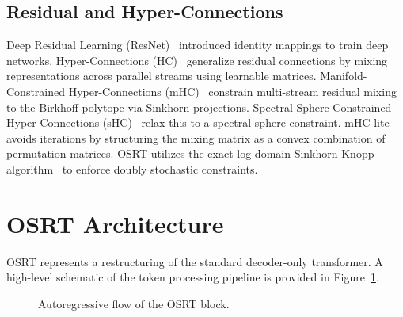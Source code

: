 \documentclass[11pt,twocolumn]{article}
\begin{document}
\subsection{Residual and Hyper-Connections}
Deep Residual Learning (ResNet)~\cite{he2015} introduced identity mappings to train deep networks. Hyper-Connections (HC)~\cite{zhu2024} generalize residual connections by mixing representations across parallel streams using learnable matrices. Manifold-Constrained Hyper-Connections (mHC)~\cite{xie2025mhc} constrain multi-stream residual mixing to the Birkhoff polytope via Sinkhorn projections. Spectral-Sphere-Constrained Hyper-Connections (sHC)~\cite{xie2026shc} relax this to a spectral-sphere constraint. mHC-lite~\cite{yang2026} avoids iterations by structuring the mixing matrix as a convex combination of permutation matrices. OSRT utilizes the exact log-domain Sinkhorn-Knopp algorithm~\cite{sinkhorn1967,cuturi2013} to enforce doubly stochastic constraints.

\section{OSRT Architecture}
OSRT represents a restructuring of the standard decoder-only transformer. A high-level schematic of the token processing pipeline is provided in Figure~\ref{fig:flow}.

\begin{figure}[t]
\centering
{}
\caption{Autoregressive flow of the OSRT block.}
\label{fig:flow}
\end{figure}
\end{document}
